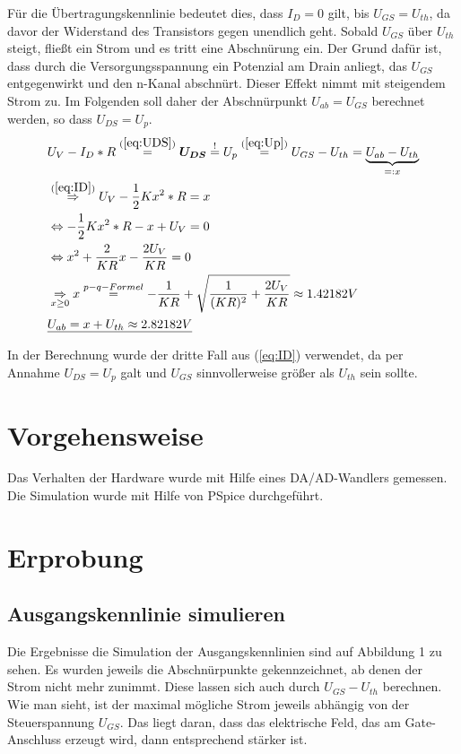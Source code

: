 \documentclass[12pt,a4paper]{scrartcl}
\begin{document}
F\"ur die \"Ubertragungskennlinie bedeutet dies, dass $I_D = 0$ gilt, bis $U_{GS} = U_{th}$, da davor der Widerstand des Transistors gegen unendlich geht.
Sobald $U_{GS}$ \"uber $U_{th}$ steigt, flie\ss t ein Strom und es tritt eine Abschn\"urung ein.
Der Grund daf\"ur ist, dass durch die Versorgungsspannung ein Potenzial am Drain anliegt, das $U_{GS}$ entgegenwirkt und den n-Kanal abschn\"urt.
Dieser Effekt nimmt mit steigendem Strom zu.
Im Folgenden soll daher der Abschn\"urpunkt $U_{ab} = U_{GS}$ berechnet werden, so dass $U_{DS} = U_p$.
\begin{align*}
&U_V - I_D*R \overset{(\ref{eq:UDS})}{=} \boldsymbol{U_{DS}} \overset{!}{=} U_p \overset{(\ref{eq:Up})}{=} U_{GS} - U_{th} = \underbrace{U_{ab} - U_{th}}_{=:x}\\
&\overset{(\ref{eq:ID})}{\Rightarrow} U_V - \frac{1}{2}Kx^2*R = x\\
&\Leftrightarrow -\frac{1}{2}Kx^2*R -x +U_V = 0 \\
&\Leftrightarrow x^2 + \frac{2}{KR}x -\frac{2U_V}{KR} = 0 \\
&\underset{x \geq 0}{\Rightarrow} x \overset{p-q-Formel}{=} -\frac{1}{KR} + \sqrt{\frac{1}{(KR)^2} + \frac{2U_V}{KR}} \approx 1.42182 V \\
&\underline{U_{ab} = x + U_{th} \approx 2.82182 V}
\end{align*}

In der Berechnung wurde der dritte Fall aus (\ref{eq:ID}) verwendet, da per Annahme $U_{DS} = U_p$ galt und $U_{GS}$ sinnvollerweise gr\"o\ss er als $U_{th}$ sein sollte.


\section{Vorgehensweise}
Das Verhalten der Hardware wurde mit Hilfe eines DA/AD-Wandlers gemessen.
Die Simulation wurde mit Hilfe von PSpice durchgef\"uhrt.

\section{Erprobung}
\subsection{Ausgangskennlinie simulieren}
Die Ergebnisse die Simulation der Ausgangskennlinien sind auf Abbildung 1 zu sehen.
Es wurden jeweils die Abschn\"urpunkte gekennzeichnet, ab denen der Strom nicht mehr zunimmt.
Diese lassen sich auch durch $U_{GS}-U_{th}$ berechnen.
Wie man sieht, ist der maximal m\"ogliche Strom jeweils abh\"angig von der Steuerspannung $U_{GS}$.
Das liegt daran, dass das elektrische Feld, das am Gate-Anschluss erzeugt wird, dann entsprechend st\"arker ist.
\end{document}
